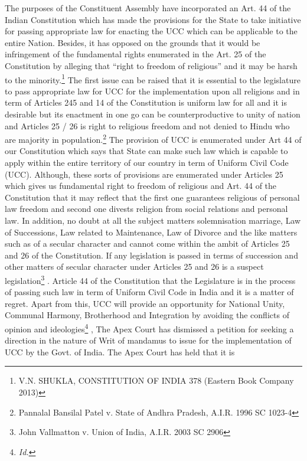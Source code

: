 \begin{multicols}{2}
\noi
The purposes of the Constituent Assembly have incorporated an Art. 44 of the Indian
Constitution which has made the provisions for the State to take
initiative for passing appropriate law for enacting the UCC which can be applicable to the
entire Nation. Besides, it has opposed on the grounds that it would be infringement of the
fundamental rights enumerated in the Art. 25 of the Constitution by alleging that “right to
freedom of religious” and it may be harsh to the minority.\footnote{V.N. SHUKLA, CONSTITUTION OF INDIA 378 (Eastern Book Company 2013)}
The first issue can be raised that it
is essential to the legislature to pass appropriate law for UCC for the implementation upon all
religions and in term of Articles 245 and 14 of the Constitution is uniform law for all and it is
desirable but its enactment in one go can be counterproductive to unity of nation and Articles
25 / 26 is right to religious freedom and not denied to Hindu who are majority in population.\footnote{Pannalal Bansilal Patel v. State of Andhra Pradesh, A.I.R. 1996 SC 1023-4}
The provision of UCC is enumerated under Art 44 of our Constitution which says that State
can make such law which is capable to apply within the entire territory of our country in term
of Uniform Civil Code (UCC). Although, these sorts of provisions are enumerated under
Articles 25 which gives us fundamental right to freedom of religious and Art. 44 of the
Constitution that it may reflect that the first one guarantees religious of personal law freedom
and second one divests religion from social relations and personal law. In addition, no doubt
at all the subject matters solemnisation marriage, Law of Successions, Law related to
Maintenance, Law of Divorce and the like matters such as of a secular character and cannot
come within the ambit of Articles 25 and 26 of the Constitution. If any legislation is passed in terms of succession and other matters of secular character under Articles 25 and 26 is a
suspect legislation\footnote{John Vallmatton v. Union of India, A.I.R. 2003 SC 2906}
. Article 44 of the Constitution that the Legislature is in the process of
passing such law in term of Uniform Civil Code in India and it is a matter of regret. Apart
from this, UCC will provide an opportunity for National Unity, Communal Harmony,
Brotherhood and Integration by avoiding the conflicts of opinion and ideologies\footnote{
\it Id.}
, The Apex
Court has dismissed a petition for seeking a direction in the nature of Writ of mandamus to
issue for the implementation of UCC by the Govt. of India. The Apex Court has held that it is

\end{multicols}
